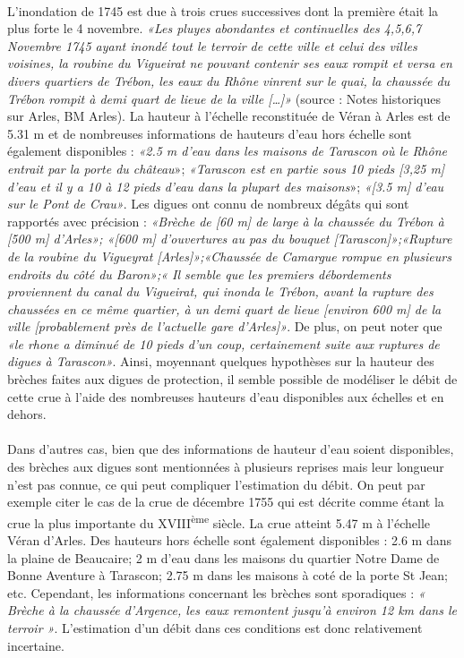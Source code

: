\documentclass[11pt]{article}
\begin{document}
	\paragraph{} L'inondation de 1745 est due à trois crues successives dont la première était la plus forte le 4 novembre. \textit{«Les pluyes abondantes et continuelles des 4,5,6,7 Novembre 1745 ayant inondé tout le terroir de cette ville et celui des villes voisines, la roubine du Vigueirat ne pouvant contenir ses eaux rompit et versa en divers quartiers de Trébon, les eaux du Rhône vinrent sur le quai, la chaussée du Trébon rompit à demi quart de lieue de la ville […]»} (source : Notes historiques sur Arles, BM Arles). La hauteur à l'échelle reconstituée de Véran à Arles est de 5.31 m et de nombreuses informations de hauteurs d'eau hors échelle sont également disponibles : \textit{«2.5 m d'eau dans les maisons de Tarascon où le Rhône entrait par la porte du château}»; \textit{«Tarascon est en partie sous 10 pieds [3,25 m] d'eau et il y a 10 à 12 pieds d'eau dans la plupart des maisons}»; \textit{«[3.5 m] d'eau sur le Pont de Crau»}. Les digues ont connu de nombreux dégâts qui sont rapportés avec précision : \textit{«Brèche de [60 m] de large à la chaussée du Trébon à [500 m] d'Arles»; «[600 m] d'ouvertures au pas du bouquet [Tarascon]»;«Rupture de la roubine du Vigueyrat [Arles]»;«Chaussée de Camargue rompue en plusieurs endroits du côté du Baron»;« Il semble que les premiers débordements proviennent du canal du Vigueirat, qui inonda le Trébon, avant la rupture des chaussées en ce même quartier, à un demi quart de lieue [environ 600 m] de la ville [probablement près de l'actuelle gare d’Arles]»}. De plus, on peut noter que \textit{«le rhone a diminué de 10 pieds d'un coup, certainement suite aux ruptures de digues à Tarascon»}. Ainsi, moyennant quelques hypothèses sur la hauteur des brèches faites aux digues de protection, il semble possible de modéliser le débit de cette crue à l'aide des nombreuses hauteurs d'eau disponibles aux échelles et en dehors. 

	\paragraph{} Dans d'autres cas, bien que des informations de hauteur d'eau soient disponibles, des brèches aux digues sont mentionnées à plusieurs reprises mais leur longueur n'est pas connue, ce qui peut compliquer l'estimation du débit. On peut par exemple citer le cas de la crue de décembre 1755 qui est décrite comme étant la crue la plus importante du XVIII\textsuperscript{ème} siècle. La crue atteint 5.47 m à l'échelle Véran d'Arles. Des hauteurs hors échelle sont également disponibles : 2.6 m dans la plaine de Beaucaire; 2 m d'eau dans les maisons du quartier Notre Dame de Bonne Aventure à Tarascon; 2.75 m dans les maisons à coté de la porte St Jean; etc. Cependant, les informations concernant les brèches sont sporadiques : \textit{« Brèche à la chaussée d'Argence, les eaux remontent jusqu'à environ 12 km dans le terroir »}. L'estimation d'un débit dans ces conditions est donc relativement incertaine.
  	
\end{document}
